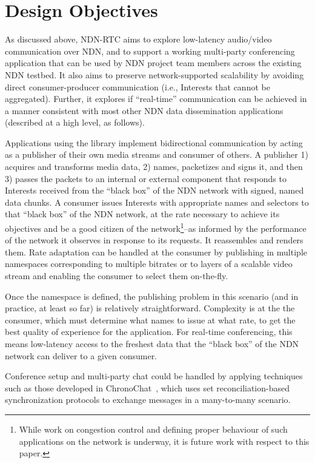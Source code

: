 \documentclass{icn/sig-alternate-2013} %
\newcommand{\ndnrtcName}{NDN-RTC} %
\begin{document}
\section{Design Objectives}
\label{sec:goals}
As discussed above, \ndnrtcName{} aims to explore low-latency audio/video communication over NDN, and to support a working multi-party conferencing application that can be used by NDN project team members across the existing NDN testbed. It also aims to preserve network-supported scalability by avoiding direct consumer-producer communication (i.e., Interests that cannot be aggregated). Further, it explores if ``real-time'' communication can be achieved in a manner consistent with most other NDN data dissemination applications (described at a high level, as follows). 

    Applications using the library implement bidirectional communication by acting as a publisher of their own media streams and consumer of others. A publisher 1) acquires and transforms media data, 2) names, packetizes and signs it, and then 3) passes the packets to an internal or external component that responds to Interests received from the ``black box'' of the NDN network with signed, named data chunks. A consumer issues Interests with appropriate names and selectors to that ``black box'' of the NDN network, at the rate necessary to achieve its objectives and be a good citizen of the network\footnote{While work on congestion control and defining proper behaviour of such applications on the network is underway, it is future work with respect to this paper.}--as informed by the performance of the network it observes in response to its requests. It reassembles and renders them.  Rate adaptation can be handled at the consumer by publishing in multiple namespaces corresponding to multiple bitrates or to layers of a scalable video stream and enabling the consumer to select them on-the-fly.

Once the namespace is defined, the publishing problem in this scenario (and in practice, at least so far) is relatively straightforward.  Complexity is at the the consumer, which must determine what names to issue at what rate, to get the best quality of experience for the application.  For real-time conferencing, this means low-latency access to the freshest data that the ``black box'' of the NDN network can deliver to a given consumer.  

Conference setup and multi-party chat could be handled by applying techniques such as those developed in ChronoChat~\cite{chronochat}, which uses set reconciliation-based synchronization protocols to exchange messages in a many-to-many scenario. 
\end{document}
